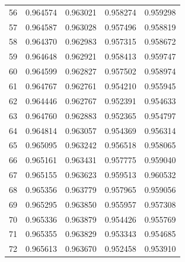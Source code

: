\begin{table}
\begin{tabular}{rrrrr}
56 & 0.964574 & 0.963021 & 0.958274 & 0.959298 \\
57 & 0.964587 & 0.963028 & 0.957496 & 0.958819 \\
58 & 0.964370 & 0.962983 & 0.957315 & 0.958672 \\
59 & 0.964648 & 0.962921 & 0.958413 & 0.959747 \\
60 & 0.964599 & 0.962827 & 0.957502 & 0.958974 \\
61 & 0.964767 & 0.962761 & 0.954210 & 0.955945 \\
62 & 0.964446 & 0.962767 & 0.952391 & 0.954633 \\
63 & 0.964760 & 0.962883 & 0.952365 & 0.954797 \\
64 & 0.964814 & 0.963057 & 0.954369 & 0.956314 \\
65 & 0.965095 & 0.963242 & 0.956518 & 0.958065 \\
66 & 0.965161 & 0.963431 & 0.957775 & 0.959040 \\
67 & 0.965155 & 0.963623 & 0.959513 & 0.960532 \\
68 & 0.965356 & 0.963779 & 0.957965 & 0.959056 \\
69 & 0.965295 & 0.963850 & 0.955957 & 0.957308 \\
70 & 0.965336 & 0.963879 & 0.954426 & 0.955769 \\
71 & 0.965355 & 0.963829 & 0.953343 & 0.954685 \\
72 & 0.965613 & 0.963670 & 0.952458 & 0.953910 \\
\bottomrule
\end{tabular}
\end{table}
